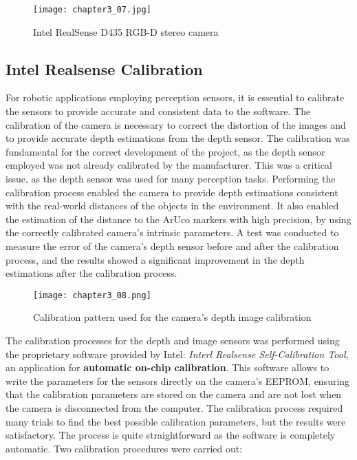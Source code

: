 \begin{figure}[t]
    \centering
    \texttt{[image: chapter3\_07.jpg]}
    \captionsetup{width=1\linewidth}
    \caption{Intel RealSense D435 RGB-D stereo camera}
    \label{fig:c3_img07}
\end{figure}

\subsection{Intel Realsense Calibration}

For robotic applications employing perception sensors, it is essential to calibrate the sensors to provide accurate
and consistent data to the software. The calibration of the camera is necessary to correct the distortion
of the images and to provide accurate depth estimations from the depth sensor.
The calibration was fundamental for the correct development of the project, as the depth sensor employed was not
already calibrated by the manufacturer. This was a critical issue, as the depth sensor was used for many perception tasks.
Performing the calibration process enabled the camera to provide depth estimations consistent with the real-world distances
of the objects in the environment. It also enabled the estimation of the distance to the ArUco markers with high precision,
by using the correctly calibrated camera's intrinsic parameters. A test was conducted to measure the error of the camera's
depth sensor before and after the calibration process, and the results showed a significant improvement in the depth
estimations after the calibration process.

\begin{figure}[t]
    \centering
    \texttt{[image: chapter3\_08.png]}
    \captionsetup{width=1\linewidth}
    \caption{Calibration pattern used for the camera's depth image calibration}
    \label{fig:c3_img08}
\end{figure}


The calibration processes for the depth and image sensors was performed using the proprietary software provided by Intel:
\textit{Interl Realsense Self-Calibration Tool}, an application for \textbf{automatic on-chip calibration}.
This software allows to write the parameters for the sensors directly on the camera's EEPROM, ensuring that the calibration
parameters are stored on the camera and are not lost when the camera is disconnected from the computer.
The calibration process required many trials to find the best possible calibration parameters, but the results were
satisfactory. The process is quite straightforward as the software is completely automatic.
Two calibration procedures were carried out:

